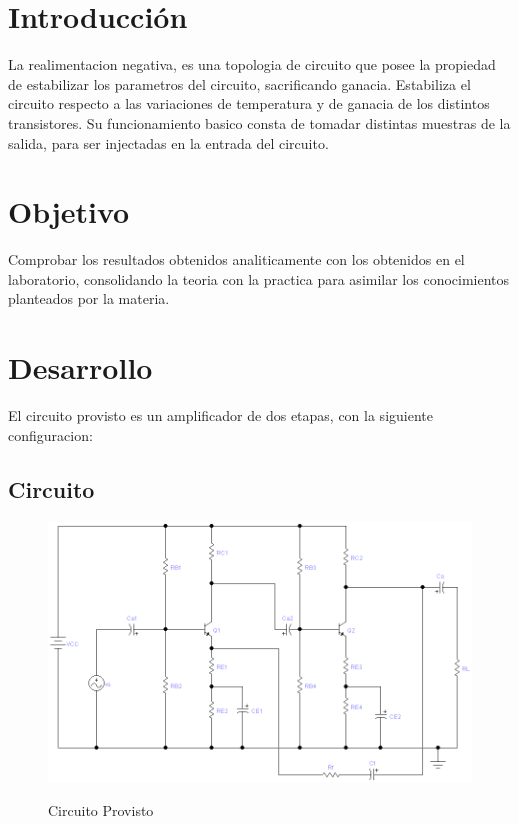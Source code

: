 \documentclass[12pt]{article}
\begin{document}

\tableofcontents
\pagebreak


\section{Introducción}
La realimentacion negativa, es una topologia de circuito que posee la propiedad de estabilizar los parametros del circuito,
sacrificando ganacia. Estabiliza el circuito respecto a las variaciones de temperatura y de ganacia de los distintos transistores.
Su funcionamiento basico consta de tomadar distintas muestras de la salida, para ser injectadas en la entrada del circuito.

\section{Objetivo}
Comprobar los resultados obtenidos analiticamente con los obtenidos en el laboratorio, consolidando
la teoria con la practica para asimilar los conocimientos planteados por la materia.
\newpage
\section{Desarrollo}
El circuito provisto es un amplificador de dos etapas, con la siguiente configuracion:
\vspace{1cm}
\subsection{Circuito}
\begin{figure}[ht]
\centering 
\includegraphics[scale = 0.4]{circuito.png}\\[0.25 cm]	%
\caption{Circuito Provisto}
\label{Figura 1}
\end{figure}
\end{document}
